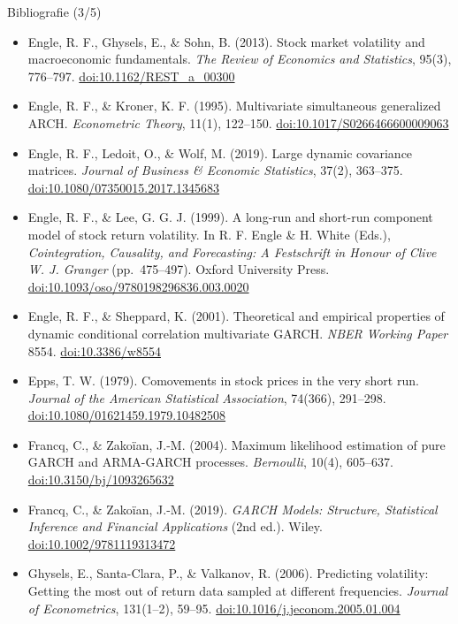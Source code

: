 \begin{frame}{Bibliografie (3/5)}
\itemsize{\tiny}
\begin{itemize}
    \item Engle, R. F., Ghysels, E., \& Sohn, B. (2013). Stock market volatility and macroeconomic fundamentals. \textit{The Review of Economics and Statistics}, 95(3), 776--797. \href{https://doi.org/10.1162/REST_a_00300}{doi:10.1162/REST\_a\_00300}
    \item Engle, R. F., \& Kroner, K. F. (1995). Multivariate simultaneous generalized ARCH. \textit{Econometric Theory}, 11(1), 122--150. \href{https://doi.org/10.1017/S0266466600009063}{doi:10.1017/S0266466600009063}
    \item Engle, R. F., Ledoit, O., \& Wolf, M. (2019). Large dynamic covariance matrices. \textit{Journal of Business \& Economic Statistics}, 37(2), 363--375. \href{https://doi.org/10.1080/07350015.2017.1345683}{doi:10.1080/07350015.2017.1345683}
    \item Engle, R. F., \& Lee, G. G. J. (1999). A long-run and short-run component model of stock return volatility. In R. F. Engle \& H. White (Eds.), \textit{Cointegration, Causality, and Forecasting: A Festschrift in Honour of Clive W. J. Granger} (pp.\ 475--497). Oxford University Press. \href{https://doi.org/10.1093/oso/9780198296836.003.0020}{doi:10.1093/oso/9780198296836.003.0020}
    \item Engle, R. F., \& Sheppard, K. (2001). Theoretical and empirical properties of dynamic conditional correlation multivariate GARCH. \textit{NBER Working Paper} 8554. \href{https://doi.org/10.3386/w8554}{doi:10.3386/w8554}
    \item Epps, T. W. (1979). Comovements in stock prices in the very short run. \textit{Journal of the American Statistical Association}, 74(366), 291--298. \href{https://doi.org/10.1080/01621459.1979.10482508}{doi:10.1080/01621459.1979.10482508}
    \item Francq, C., \& Zakoïan, J.-M. (2004). Maximum likelihood estimation of pure GARCH and ARMA-GARCH processes. \textit{Bernoulli}, 10(4), 605--637. \href{https://doi.org/10.3150/bj/1093265632}{doi:10.3150/bj/1093265632}
    \item Francq, C., \& Zakoïan, J.-M. (2019). \textit{GARCH Models: Structure, Statistical Inference and Financial Applications} (2nd ed.). Wiley. \href{https://doi.org/10.1002/9781119313472}{doi:10.1002/9781119313472}
    \item Ghysels, E., Santa-Clara, P., \& Valkanov, R. (2006). Predicting volatility: Getting the most out of return data sampled at different frequencies. \textit{Journal of Econometrics}, 131(1--2), 59--95. \href{https://doi.org/10.1016/j.jeconom.2005.01.004}{doi:10.1016/j.jeconom.2005.01.004}

\end{itemize}
\end{frame}
